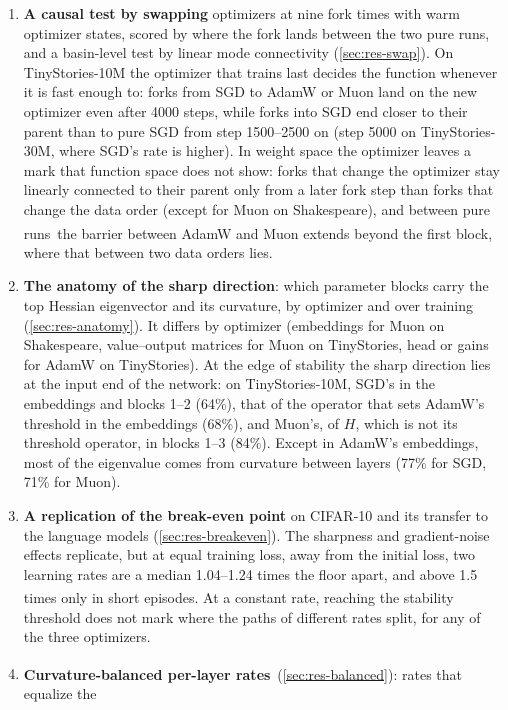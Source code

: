 \documentclass[10pt]{article}
\newcommand{\extra}{\textsuperscript{\dag}}  %
\begin{document}
\begin{enumerate}[leftmargin=1.5em]
  its auxiliary AdamW matched to AdamW\extra\ still memorizes on Shakespeare, so the
  memorization comes from its updates of the hidden matrices.
\item \textbf{A causal test by swapping} optimizers at nine fork times with warm optimizer states, scored by
  where the fork lands between the two pure runs, and a basin-level test by linear mode connectivity
  (\cref{sec:res-swap}). On TinyStories-10M the optimizer that trains last decides the function whenever it is
  fast enough to: forks from SGD to AdamW or Muon land on the new optimizer even after 4000 steps, while forks
  into SGD end closer to their parent than to pure SGD from step 1500--2500 on (step 5000 on TinyStories-30M, where
  SGD's rate is higher). In weight space the optimizer leaves a mark that function space
  does not show: forks that change the optimizer stay linearly connected to their parent only from a later fork
  step than forks that change the data order (except for Muon on Shakespeare), and between pure runs\extra\ the
  barrier between AdamW and Muon extends beyond the first block, where that between two data orders lies.
\item \textbf{The anatomy of the sharp direction}: which parameter blocks carry the top Hessian eigenvector
  and its curvature, by optimizer and over training (\cref{sec:res-anatomy}). It differs by optimizer
  (embeddings for Muon on Shakespeare, value--output matrices for Muon on TinyStories, head or gains for
  AdamW on TinyStories). At the edge of stability the sharp direction lies at the input end of the network: on
  TinyStories-10M, SGD's in the embeddings and blocks 1--2 (64\%), that of the operator that sets AdamW's threshold in the
  embeddings (68\%), and Muon's, of $H$, which is not its threshold operator, in blocks 1--3 (84\%). Except in
  AdamW's embeddings, most of the eigenvalue comes from curvature between layers (77\% for SGD, 71\% for Muon).
\item \textbf{A replication of the break-even point} on CIFAR-10 and its transfer to the language models
  (\cref{sec:res-breakeven}). The sharpness and gradient-noise effects replicate, but at equal training loss,
  away from the initial loss, two learning rates are a median 1.04--1.24 times the floor apart, and above 1.5 times
  only in short episodes. At a constant rate\extra,
  reaching the stability threshold does not mark where the paths of different rates split, for any of the three
  optimizers.
\item \textbf{Curvature-balanced per-layer rates}\extra\ (\cref{sec:res-balanced}): rates that equalize the

\end{enumerate}
\end{document}
